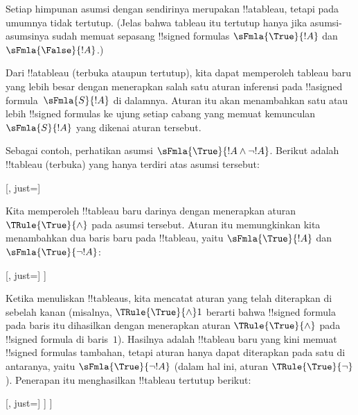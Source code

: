 \documentclass[../../../include/open-logic-section]{subfiles}
\begin{document}
\begin{ex}
  Setiap himpunan asumsi dengan sendirinya merupakan !!a{tableau}, tetapi
  pada umumnya tidak tertutup. (Jelas bahwa tableau itu tertutup hanya
  jika asumsi-asumsinya sudah memuat sepasang !!{signed formula}s
  $\sFmla{\True}{!A}$ dan~$\sFmla{\False}{!A}$.)

  Dari !!a{tableau} (terbuka ataupun tertutup), kita dapat memperoleh
  tableau baru yang lebih besar dengan menerapkan salah satu aturan
  inferensi pada !!a{signed formula}~$\sFmla{S}{!A}$ di dalamnya. Aturan itu akan
  menambahkan satu atau lebih !!{signed formula}s ke ujung setiap cabang
  yang memuat kemunculan~$\sFmla{S}{!A}$ yang dikenai aturan tersebut.

  Sebagai contoh, perhatikan asumsi $\sFmla{\True}{!A \land \lnot
    !A}$. Berikut adalah !!{tableau} (terbuka) yang hanya terdiri atas
  asumsi tersebut:
  \begin{center}
    \begin{tableau}{}
      [, just=\TAss]
    \end{tableau}{}
  \end{center}
  Kita memperoleh !!{tableau} baru darinya dengan menerapkan aturan
  $\TRule{\True}{\land}$ pada asumsi tersebut. Aturan itu memungkinkan
  kita menambahkan dua baris baru pada !!{tableau}, yaitu
  $\sFmla{\True}{!A}$ dan $\sFmla{\True}{\lnot !A}$:
  \begin{center}
    \begin{tableau}{}
      [, just=\TAss
        [\sFmla{\True}{\formula{A}}, just={\TRule{\True}{\land}[1]},
          [\sFmla{\True}{\lnot \formula{A}}, just={\TRule{\True}{\land}[1]}
          ]
        ]
      ]
    \end{tableau}{}
  \end{center}
  Ketika menuliskan !!{tableau}s, kita mencatat aturan yang telah
  diterapkan di sebelah kanan (misalnya, $\TRule{\True}{\land} 1$
  berarti bahwa !!{signed formula} pada baris itu dihasilkan dengan
  menerapkan aturan $\TRule{\True}{\land}$ pada !!{signed formula} di
  baris~$1$). Hasilnya adalah !!{tableau} baru yang kini memuat
  !!{signed formula}s tambahan, tetapi aturan hanya dapat diterapkan pada satu di antaranya,
  yaitu $\sFmla{\True}{\lnot !A}$ (dalam hal ini, aturan
  $\TRule{\True}{\lnot}$). Penerapan itu menghasilkan !!{tableau}
  tertutup berikut:
  \begin{center}
    \begin{tableau}{}
      [, just=\TAss
        [\sFmla{\True}{\formula{A}}, just={\TRule{\True}{\land}[1]}
          [\sFmla{\True}{\lnot \formula{A}}, just={\TRule{\True}{\land}[1]}
            [\sFmla{\False}{\formula{A}}, just={\TRule{\True}{\lnot}[3]}, close]
          ]
        ]
      ]
    \end{tableau}{}
  \end{center}
\end{ex}
\end{document}
